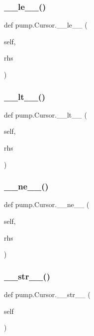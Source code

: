 \subsubsection{\texorpdfstring{\_\_le\_\_()}{\_\_le\_\_()}}
{\footnotesize\ttfamily def pump.\+Cursor.\+\_\+\+\_\+le\+\_\+\+\_\+ (\begin{DoxyParamCaption}\item[{}]{self,  }\item[{}]{rhs }\end{DoxyParamCaption})}

\mbox{\label{classpump_1_1Cursor_a4f846e3cf80aa45853b1fb7a03863745}} 
\subsubsection{\texorpdfstring{\_\_lt\_\_()}{\_\_lt\_\_()}}
{\footnotesize\ttfamily def pump.\+Cursor.\+\_\+\+\_\+lt\+\_\+\+\_\+ (\begin{DoxyParamCaption}\item[{}]{self,  }\item[{}]{rhs }\end{DoxyParamCaption})}

\mbox{\label{classpump_1_1Cursor_a7bcfe24fa4e5df6ed12f627b8d3b3ba3}} 
\subsubsection{\texorpdfstring{\_\_ne\_\_()}{\_\_ne\_\_()}}
{\footnotesize\ttfamily def pump.\+Cursor.\+\_\+\+\_\+ne\+\_\+\+\_\+ (\begin{DoxyParamCaption}\item[{}]{self,  }\item[{}]{rhs }\end{DoxyParamCaption})}

\mbox{\label{classpump_1_1Cursor_ada8d922763be27a0b1745e94748de2c3}} 
\subsubsection{\texorpdfstring{\_\_str\_\_()}{\_\_str\_\_()}}
{\footnotesize\ttfamily def pump.\+Cursor.\+\_\+\+\_\+str\+\_\+\+\_\+ (\begin{DoxyParamCaption}\item[{}]{self }\end{DoxyParamCaption})}

